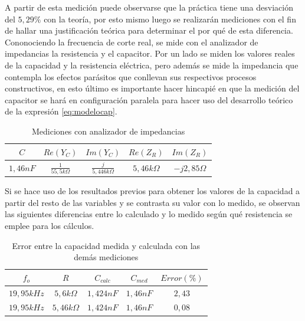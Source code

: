 A partir de esta medici\'on puede observarse que la pr\'actica tiene una desviaci\'on del $ 5,29 \% $ con la teor\'ia, por esto mismo luego se realizar\'an mediciones con el fin de hallar una justificaci\'on te\'orica para determinar el por qu\'e de esta diferencia. \\

Cononociendo la frecuencia de corte real, se mide con el analizador de impedancias la resistencia y el capacitor. Por un lado se miden los valores reales de la capacidad y la resistencia el\'ectrica, pero adem\'as se mide la impedancia que contempla los efectos par\'asitos que conllevan sus respectivos procesos constructivos, en esto \'ultimo es importante hacer hincapi\'e en que la medici\'on del capacitor se har\'a en configuraci\'on paralela para hacer uso del desarrollo te\'orico de la expresi\'on \ref{eq:modelocap}.

\begin{table}[H]
	\begin{center}
		\begin{tabular}{c c c c c}
		$C$ & $Re(Y_C)$ & $Im(Y_C)$ & $Re(Z_R)$ & $Im(Z_R)$ \\
		\hline
		$1,46nF$ & $\frac{1}{55,5k \Omega}$ & $\frac{j}{5,446k \Omega}$ & $5,46k \Omega$ & $-j2,85 \Omega$
		\end{tabular}
		
		\caption{Mediciones con analizador de impedancias}
	\end{center}
\end{table}

Si se hace uso de los resultados previos para obtener los valores de la capacidad a partir del resto de las variables y se contrasta su valor con lo medido, se observan las siguientes diferencias entre lo calculado y lo medido seg\'un qu\'e resistencia se emplee para los c\'alculos.

\begin{table}[H]
	\begin{center}
		\begin{tabular}{c c c c c}
		$f_o$ & $R$ & $C_{calc}$ & $C_{med}$ & $Error(\%)$ \\
		\hline
		$19,95kHz$ & $5,6k \Omega$ & $1,424nF$ & $1,46nF$ & $2,43$ \\
		$19,95kHz$ & $5,46k \Omega$ & $1,424nF$ & $1,46nF$ & $0,08$
		\end{tabular}
		
		\caption{Error entre la capacidad medida y calculada con las dem\'as mediciones}
	\end{center}
\end{table}

